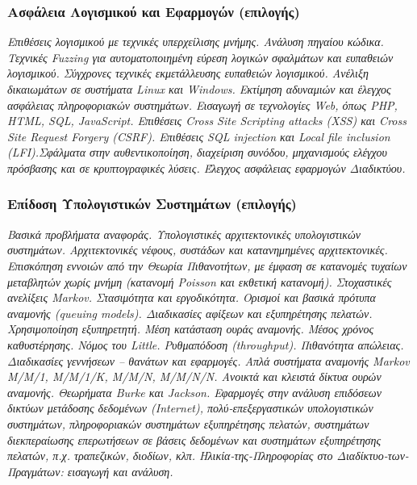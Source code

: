 \hypertarget{ux3b1ux3c3ux3c6ux3acux3bbux3b5ux3b9ux3b1-ux3bbux3bfux3b3ux3b9ux3c3ux3bcux3b9ux3baux3bfux3cd-ux3baux3b1ux3b9-ux3b5ux3c6ux3b1ux3c1ux3bcux3bfux3b3ux3ceux3bd-ux3b5ux3c0ux3b9ux3bbux3bfux3b3ux3aeux3c2}{%
\subsubsection{Ασφάλεια Λογισμικού και Εφαρμογών
(επιλογής)}\label{ux3b1ux3c3ux3c6ux3acux3bbux3b5ux3b9ux3b1-ux3bbux3bfux3b3ux3b9ux3c3ux3bcux3b9ux3baux3bfux3cd-ux3baux3b1ux3b9-ux3b5ux3c6ux3b1ux3c1ux3bcux3bfux3b3ux3ceux3bd-ux3b5ux3c0ux3b9ux3bbux3bfux3b3ux3aeux3c2}}

\emph{Επιθέσεις λογισμικού με τεχνικές υπερχείλισης μνήμης. Ανάλυση
πηγαίου κώδικα. Τεχνικές Fuzzing για αυτοματοποιημένη εύρεση λογικών
σφαλμάτων και ευπαθειών λογισμικού. Σύγχρονες τεχνικές εκμετάλλευσης
ευπαθειών λογισμικού. Ανέλιξη δικαιωμάτων σε συστήματα Linux και
Windows. Εκτίμηση αδυναμιών και έλεγχος ασφάλειας πληροφοριακών
συστημάτων. Εισαγωγή σε τεχνολογίες Web, όπως PHP, HTML, SQL,
JavaScript. Επιθέσεις Cross Site Scripting attacks (XSS) και Cross Site
Request Forgery (CSRF). Επιθέσεις SQL injection και Local file inclusion
(LFI).Σφάλματα στην αυθεντικοποίηση, διαχείριση συνόδου, μηχανισμούς
ελέγχου πρόσβασης και σε κρυπτογραφικές λύσεις. Έλεγχος ασφάλειας
εφαρμογών Διαδικτύου.}

\hypertarget{ux3b5ux3c0ux3afux3b4ux3bfux3c3ux3b7-ux3c5ux3c0ux3bfux3bbux3bfux3b3ux3b9ux3c3ux3c4ux3b9ux3baux3ceux3bd-ux3c3ux3c5ux3c3ux3c4ux3b7ux3bcux3acux3c4ux3c9ux3bd-ux3b5ux3c0ux3b9ux3bbux3bfux3b3ux3aeux3c2}{%
\subsubsection{Επίδοση Υπολογιστικών Συστημάτων
(επιλογής)}\label{ux3b5ux3c0ux3afux3b4ux3bfux3c3ux3b7-ux3c5ux3c0ux3bfux3bbux3bfux3b3ux3b9ux3c3ux3c4ux3b9ux3baux3ceux3bd-ux3c3ux3c5ux3c3ux3c4ux3b7ux3bcux3acux3c4ux3c9ux3bd-ux3b5ux3c0ux3b9ux3bbux3bfux3b3ux3aeux3c2}}

\emph{Βασικά προβλήματα αναφοράς. Υπολογιστικές αρχιτεκτονικές
υπολογιστικών συστημάτων. Αρχιτεκτονικές νέφους, συστάδων και
κατανημημένες αρχιτεκτονικές. Επισκόπηση εννοιών από την Θεωρία
Πιθανοτήτων, με έμφαση σε κατανομές τυχαίων μεταβλητών χωρίς μνήμη
(κατανομή Poisson και εκθετική κατανομή). Στοχαστικές ανελίξεις Markov.
Στασιμότητα και εργοδικότητα. Ορισμοί και βασικά πρότυπα αναμονής
(queuing models). Διαδικασίες αφίξεων και εξυπηρέτησης πελατών.
Χρησιμοποίηση εξυπηρετητή. Μέση κατάσταση ουράς αναμονής. Μέσος χρόνος
καθυστέρησης. Νόμος του Little. Ρυθμαπόδοση (throughput). Πιθανότητα
απώλειας. Διαδικασίες γεννήσεων -- θανάτων και εφαρμογές. Απλά συστήματα
αναμονής Markov M/M/1, M/M/1/K, M/M/N, M/M/N/N. Ανοικτά και κλειστά
δίκτυα ουρών αναμονής. Θεωρήματα Burke και Jackson. Εφαρμογές στην
ανάλυση επιδόσεων δικτύων μετάδοσης δεδομένων (Internet),
πολύ-επεξεργαστικών υπολογιστικών συστημάτων, πληροφοριακών συστημάτων
εξυπηρέτησης πελατών, συστημάτων διεκπεραίωσης επερωτήσεων σε βάσεις
δεδομένων και συστημάτων εξυπηρέτησης πελατών, π.χ. τραπεζικών, διοδίων,
κλπ. Ηλικία-της-Πληροφορίας στο Διαδίκτυο-των-Πραγμάτων: εισαγωγή και
ανάλυση.}

